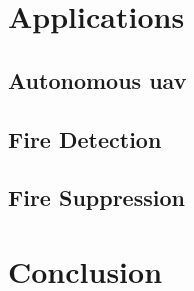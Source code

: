 \documentclass[runningheads]{llncs}
\begin{document}
\section{Applications}

\subsection{Autonomous \acrshort{uav}}

\subsection{Fire Detection}

\subsection{Fire Suppression}

\section{Conclusion}


\end{document}
